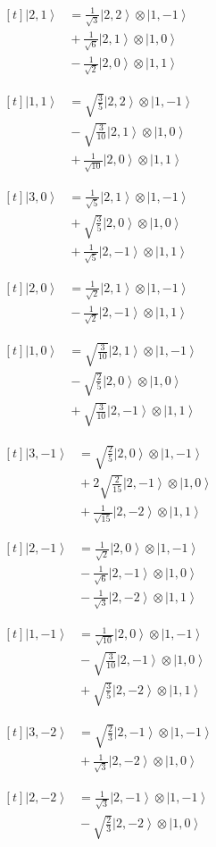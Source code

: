 \documentclass[11pt,a4paper]{article}
\newcommand{\estadocelda}[1]{%
  \begin{minipage}[t]{0.48\linewidth}
  \small\raggedright
  \(\displaystyle\begin{aligned}[t]#1\end{aligned}\)
  \end{minipage}%
}
\newcommand{\ket}[1]{\left|#1\right\rangle}
\begin{document}
\noindent\estadocelda{
\ket{2,1} &= \frac{1}{\sqrt{3}}\ket{2,2}\otimes\ket{1,-1} \\
 &{}+\frac{1}{\sqrt{6}}\ket{2,1}\otimes\ket{1,0} \\
 &{}-\frac{1}{\sqrt{2}}\ket{2,0}\otimes\ket{1,1}
}\hfill\estadocelda{
\ket{1,1} &= \sqrt{\frac{3}{5}}\ket{2,2}\otimes\ket{1,-1} \\
 &{}-\sqrt{\frac{3}{10}}\ket{2,1}\otimes\ket{1,0} \\
 &{}+\frac{1}{\sqrt{10}}\ket{2,0}\otimes\ket{1,1}
}\par\addvspace{1.4em}

\noindent\estadocelda{
\ket{3,0} &= \frac{1}{\sqrt{5}}\ket{2,1}\otimes\ket{1,-1} \\
 &{}+\sqrt{\frac{3}{5}}\ket{2,0}\otimes\ket{1,0} \\
 &{}+\frac{1}{\sqrt{5}}\ket{2,-1}\otimes\ket{1,1}
}\hfill\estadocelda{
\ket{2,0} &= \frac{1}{\sqrt{2}}\ket{2,1}\otimes\ket{1,-1} \\
 &{}-\frac{1}{\sqrt{2}}\ket{2,-1}\otimes\ket{1,1}
}\par\addvspace{1.4em}

\noindent\estadocelda{
\ket{1,0} &= \sqrt{\frac{3}{10}}\ket{2,1}\otimes\ket{1,-1} \\
 &{}-\sqrt{\frac{2}{5}}\ket{2,0}\otimes\ket{1,0} \\
 &{}+\sqrt{\frac{3}{10}}\ket{2,-1}\otimes\ket{1,1}
}\hfill\estadocelda{
\ket{3,-1} &= \sqrt{\frac{2}{5}}\ket{2,0}\otimes\ket{1,-1} \\
 &{}+2\sqrt{\frac{2}{15}}\ket{2,-1}\otimes\ket{1,0} \\
 &{}+\frac{1}{\sqrt{15}}\ket{2,-2}\otimes\ket{1,1}
}\par\addvspace{1.4em}

\noindent\estadocelda{
\ket{2,-1} &= \frac{1}{\sqrt{2}}\ket{2,0}\otimes\ket{1,-1} \\
 &{}-\frac{1}{\sqrt{6}}\ket{2,-1}\otimes\ket{1,0} \\
 &{}-\frac{1}{\sqrt{3}}\ket{2,-2}\otimes\ket{1,1}
}\hfill\estadocelda{
\ket{1,-1} &= \frac{1}{\sqrt{10}}\ket{2,0}\otimes\ket{1,-1} \\
 &{}-\sqrt{\frac{3}{10}}\ket{2,-1}\otimes\ket{1,0} \\
 &{}+\sqrt{\frac{3}{5}}\ket{2,-2}\otimes\ket{1,1}
}\par\addvspace{1.4em}

\noindent\estadocelda{
\ket{3,-2} &= \sqrt{\frac{2}{3}}\ket{2,-1}\otimes\ket{1,-1} \\
 &{}+\frac{1}{\sqrt{3}}\ket{2,-2}\otimes\ket{1,0}
}\hfill\estadocelda{
\ket{2,-2} &= \frac{1}{\sqrt{3}}\ket{2,-1}\otimes\ket{1,-1} \\
 &{}-\sqrt{\frac{2}{3}}\ket{2,-2}\otimes\ket{1,0}
}\par\addvspace{1.4em}
\end{document}
